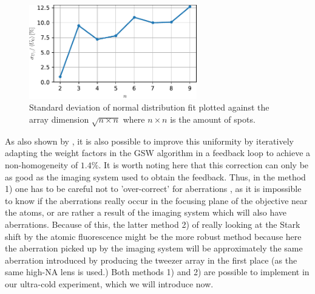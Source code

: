 \begin{figure}
    \centering
    \includegraphics[width=0.65\textwidth]{figures/UniformityAmountsSpots.pdf}
    \caption{Standard deviation of normal distribution fit plotted against the array dimension $\sqrt{n\times n}$ where $n \times n$ is the amount of spots. }
    \label{fig:Uniformity}
\end{figure}
As also shown by \cite{Nogrette2014}, it is also possible to improve this uniformity by iteratively adapting the weight factors in the \ac{GSW} algorithm in a feedback loop to achieve a non-homogeneity of $1.4\%$.
It is worth noting here that this correction can only be as good as the imaging system used to obtain the feedback. 
Thus, in the method 1) one has to be careful not to 'over-correct' for aberrations \cite{Labuhn2016}, as it is impossible to know if the aberrations really occur in the focusing plane of the objective near the atoms, or are rather a result of the imaging system which will also have aberrations. 
Because of this, the latter method 2) of really looking at the Stark shift by the atomic fluorescence might be the more robust method because here the aberration picked up by the imaging system will be approximately the same aberration introduced by producing the tweezer array in the first place (as the same high-NA lens is used.)
Both methods 1) and 2) are possible to implement in our ultra-cold experiment, which we will introduce now.







